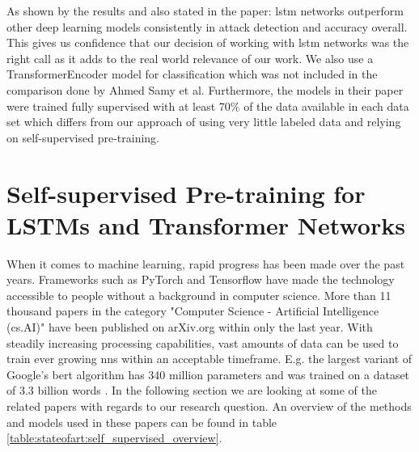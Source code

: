 As shown by the results and also stated in the paper: \gls{lstm} networks outperform other deep learning models consistently in attack detection and accuracy overall. This gives us confidence that our decision of working with \gls{lstm} networks was the right call as it adds to the real world relevance of our work. We also use a TransformerEncoder model for classification which was not included in the comparison done by Ahmed Samy et al. Furthermore, the models in their paper were trained fully supervised with at least 70\% of the data available in each data set which differs from our approach of using very little labeled data and relying on self-supervised pre-training.

\section{Self-supervised Pre-training for LSTMs and Transformer Networks}

When it comes to machine learning, rapid progress has been made over the past years. Frameworks such as PyTorch \cite{pytorch} and Tensorflow \cite{tensorflow} have made the technology accessible to people without a background in computer science. More than 11 thousand papers in the category "Computer Science - Artificial Intelligence (cs.AI)" have been published on arXiv.org \cite{arxiv} within only the last year. With steadily increasing processing capabilities, vast amounts of data can be used to train ever growing \glspl{nn} within an acceptable timeframe. E.g. the largest variant of Google's \gls{bert} algorithm has 340 million parameters and was trained on a dataset of 3.3 billion words \cite{bert}. In the following section we are looking at some of the related papers with regards to our research question. An overview of the methods and models used in these papers can be found in table \ref{table:stateofart:self_supervised_overview}. \par

